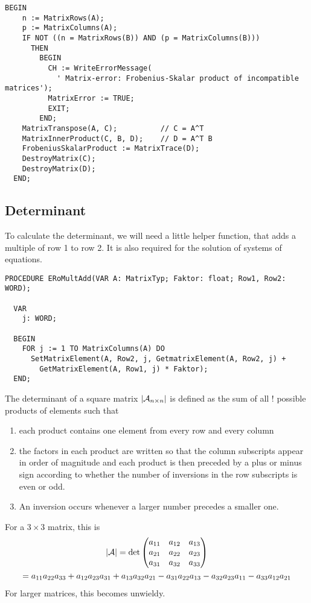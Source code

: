 \begin{refsection}
\begin{lstlisting}[caption=Frobenius skalar product]
  BEGIN
    n := MatrixRows(A);
    p := MatrixColumns(A);
    IF NOT ((n = MatrixRows(B)) AND (p = MatrixColumns(B)))
      THEN
        BEGIN
          CH := WriteErrorMessage(
            ' Matrix-error: Frobenius-Skalar product of incompatible matrices');
          MatrixError := TRUE;
          EXIT;
        END;
    MatrixTranspose(A, C);          // C = A^T
    MatrixInnerProduct(C, B, D);    // D = A^T B
    FrobeniusSkalarProduct := MatrixTrace(D);
    DestroyMatrix(C);
    DestroyMatrix(D);
  END;
\end{lstlisting}

\subsection{Determinant}

To calculate the determinant, we will need a little helper function, that adds a multiple of row 1 to row 2. It is also required for the solution of systems of equations.

\begin{lstlisting}[caption=add multiple of row 1 to row 2]
  PROCEDURE ERoMultAdd(VAR A: MatrixTyp; Faktor: float; Row1, Row2: WORD);

  VAR
    j: WORD;

  BEGIN
    FOR j := 1 TO MatrixColumns(A) DO
      SetMatrixElement(A, Row2, j, GetmatrixElement(A, Row2, j) +
        GetMatrixElement(A, Row1, j) * Faktor);
  END;
\end{lstlisting}


The determinant of a square matrix \(|\mathcal{A}_{n \times n}| \) is defined as the sum of all ! possible products of  elements such that
\begin{enumerate}
  \item{each product contains one element from every row and every column}
  \item{the factors in each product are written so that the column subscripts appear in order of magnitude and each product is then preceded by a plus or minus sign according to whether the number of inversions in the row subscripts is even or odd.}
  \item{An inversion occurs whenever a larger number precedes a smaller one.}
\end{enumerate}
For a \(3\times 3 \) matrix, this is
\begin{gather}
   |\mathcal{A}| = \det\begin{pmatrix}
                      a_{11} & a_{12} & a_{13} \\
                      a_{21} & a_{22} & a_{23} \\
                      a_{31} & a_{32} & a_{33}
                   \end{pmatrix} \\
                   =   a_{11} a_{22} a_{33} + a_{12} a_{23} a_{31} + a_{13} a_{32} a_{21} - a_{31} a_{22} a_{13} - a_{32} a_{23} a_{11} - a_{33} a_{12} a_{21}
\end{gather}
For larger matrices, this becomes unwieldy.


\end{refsection}
